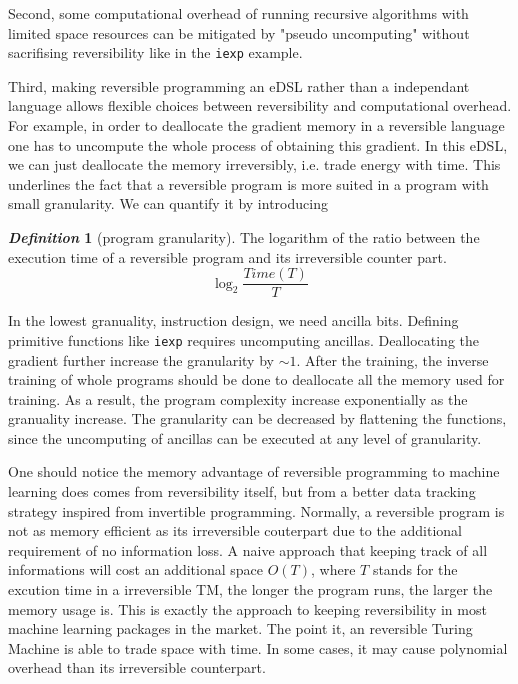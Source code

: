 \documentclass[aps,twocolumn,longbibliography,english,superscriptaddress,prr]{revtex4-1}
\newcommand{\<}{\langle}
\renewcommand{\>}{\rangle}
\theoremstyle{definition}\newtheorem{definition}{\textit{Definition}}
\begin{document}
Second, some computational overhead of running recursive algorithms with limited space resources can be mitigated by "pseudo uncomputing" without sacrifising reversibility like in the \texttt{iexp} example.

Third, making reversible programming an eDSL rather than a independant language allows flexible choices between reversibility and computational overhead. For example, in order to deallocate the gradient memory in a reversible language one has to uncompute the whole process of obtaining this gradient.
In this eDSL, we can just deallocate the memory irreversibly, i.e. trade energy with time. This underlines the fact that a reversible program is more suited in a program with small granularity. We can quantify it by introducing
\begin{definition}[program granularity]
    The logarithm of the ratio between the execution time of a reversible program and its irreversible counter part.
    \begin{equation}
        \log_2 \frac{Time(T)}{T}
    \end{equation}
\end{definition}

In the lowest granuality, instruction design, we need ancilla bits. Defining primitive functions like \texttt{iexp} requires uncomputing ancillas. Deallocating the gradient further increase the granularity by $\sim 1$. After the training, the inverse training of whole programs should be done to deallocate all the memory used for training. As a result, the program complexity increase exponentially as the granuality increase.
The granularity can be decreased by flattening the functions, since the uncomputing of ancillas can be executed at any level of granularity.

One should notice the memory advantage of reversible programming to machine learning does comes from reversibility itself, but from a better data tracking strategy inspired from invertible programming.
Normally, a reversible program is not as memory efficient as its irreversible couterpart due to the additional requirement of no information loss. A naive approach that keeping track of all informations will cost an additional space $O(T)$, where $T$ stands for the excution time in a irreversible TM, the longer the program runs, the larger the memory usage is. This is exactly the approach to keeping reversibility in most machine learning packages in the market.
The point it, an reversible Turing Machine is able to trade space with time.
In some cases, it may cause polynomial overhead than its irreversible counterpart.
\end{document}
